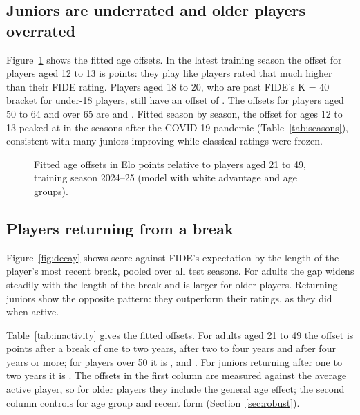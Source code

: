 \documentclass[11pt]{article}
\begin{document}
\subsection{Juniors are underrated and older players overrated}

Figure~\ref{fig:age} shows the fitted age offsets. In the latest training season the offset for players aged 12 to 13 is \AgeTwelve{} points: they play like players rated that much higher than their FIDE rating. Players aged 18 to 20, who are past FIDE's K = 40 bracket for under-18 players, still have an offset of \AgeEighteen{}. The offsets for players aged 50 to 64 and over 65 are \AgeFifty{} and \AgeSixtyFive{}. Fitted season by season, the offset for ages 12 to 13 peaked at \AgeTwelvePeak{} in the seasons after the COVID-19 pandemic (Table~\ref{tab:seasons}), consistent with many juniors improving while classical ratings were frozen.

\begin{figure}[htbp]
\centering

\caption{Fitted age offsets in Elo points relative to players aged 21 to 49, training season 2024--25 (model with white advantage and age groups).}
\label{fig:age}
\end{figure}

\subsection{Players returning from a break}

Figure~\ref{fig:decay} shows score against FIDE's expectation by the length of the player's most recent break, pooled over all test seasons. For adults the gap widens steadily with the length of the break and is larger for older players. Returning juniors show the opposite pattern: they outperform their ratings, as they did when active.

Table~\ref{tab:inactivity} gives the fitted offsets. For adults aged 21 to 49 the offset is \DecayMidOneTwo{} points after a break of one to two years, \DecayMidTwoFour{} after two to four years and \DecayMidFour{} after four years or more; for players over 50 it is \DecayOldOneTwo{}, \DecayOldTwoFour{} and \DecayOldFour{}. For juniors returning after one to two years it is \DecayYoungOneTwo{}. The offsets in the first column are measured against the average active player, so for older players they include the general age effect; the second column controls for age group and recent form (Section~\ref{sec:robust}).
\end{document}
